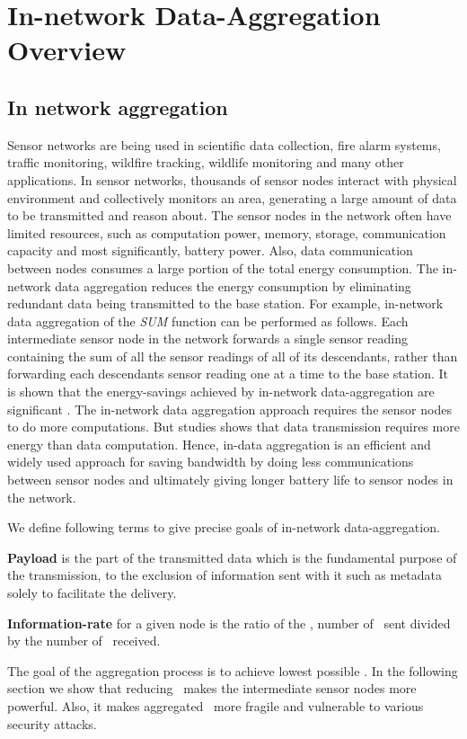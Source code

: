 \chapter{In-network Data-Aggregation Overview} %
\label{cha:In-network Data-Aggregation Overview}

\section{In network aggregation}
	Sensor networks are being used in scientific data collection, fire alarm systems, traffic monitoring, wildfire tracking, wildlife monitoring and many other applications.
	In sensor networks, thousands of sensor nodes interact with physical environment and collectively monitors an area, generating a large amount of data to be transmitted and reason about.
	The sensor nodes in the network often have limited resources, such as computation power, memory, storage, communication capacity and most significantly, battery power.
	Also, data communication between nodes consumes a large portion of the total energy consumption. 
	The in-network data aggregation reduces the energy consumption by eliminating redundant data being transmitted to the base station.
	For example, in-network data aggregation of the \textit{SUM} function can be performed as follows. 
	Each intermediate sensor node in the network forwards a single sensor reading containing the sum of all the sensor readings of all of its descendants, rather than forwarding each descendants sensor reading one at a time to the base station.
	It is shown that the energy-savings achieved by in-network data-aggregation are significant \cite{madden2002tag}.
	The in-network data aggregation approach requires the sensor nodes to do more computations.
	But studies shows that data transmission requires more energy than data computation. 
	Hence, in-data aggregation is an efficient and widely used approach for saving bandwidth by doing less communications between sensor nodes and ultimately giving longer battery life to sensor nodes in the network.

	We define following terms to give precise goals of in-network data-aggregation.
	\begin{definition}\label{def:payload}
		\textbf{Payload} is the part of the transmitted data which is the fundamental purpose of the transmission, to the exclusion of information sent with it such as metadata solely to facilitate the delivery.
	\end{definition}
	\begin{definition}\label{def:information-rate}
		\textbf{Information-rate} for a given node is the ratio of the \payloads, number of \payloads\ sent divided by the number of \payloads\ received.
	\end{definition}
	The goal of the aggregation process is to achieve lowest possible \informationRate.
	In the following section we show that reducing \informationRate\ makes the intermediate sensor nodes more powerful. Also, it makes aggregated \payload\  more fragile and vulnerable to various security attacks.

